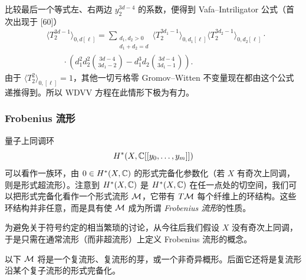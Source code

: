 比较最后一个等式左、右两边 $y_2^{3d-4}$ 的系数，便得到 Vafa–Intriligator 公式（首次出现于 [60]）
\begin{align*}
&\langle T_2^{3d-1}\rangle_{0,d[\ell]}=\sum_{\substack{d_1,d_2>0\\d_1+d_2=d}}\langle T_2^{3d_1-1}\rangle_{0,d_1[\ell]}\langle T_2^{3d_2-1}\rangle_{0,d_2[\ell]}\cdot\\
&\qquad\cdot\left(d_1^2d_2^2\binom{3d-4}{3d_1-2}-d_1^3d_2\binom{3d-4}{3d_1-1}\right).
\end{align*}
由于 $\langle T_2^2\rangle_{0,[\ell]}=1$，其他一切亏格零 Gromov–Witten 不变量现在都由这个公式递推得到。所以 WDVV 方程在此情形下极为有力。


\subsubsection{Frobenius 流形}

量子上同调环
\[
H^{*}(X,\mathbb{C}[[y_0,\dots,y_m]])
\]
可以看作一族环，由 $0\in H^{*}(X,\mathbb{C})$ 的形式完备化参数化（若 $X$ 有奇次上同调，则是形式超流形）。注意到 $H^{*}(X,\mathbb{C})$ 是 $H^{*}(X,\mathbb{C})$ 在任一点处的切空间，我们可以把形式完备化看作一个形式流形 $\mathcal{M}$，它带有 $T\mathcal{M}$ 每个纤维上的环结构。这些环结构并非任意，而是具有使 $\mathcal{M}$ 成为所谓 \emph{Frobenius 流形}的性质。

为避免关于符号约定的相当繁琐的讨论，从今往后我们假设 $X$ 没有奇次上同调，于是只需在通常流形（而非超流形）上定义 Frobenius 流形的概念。

以下 $\mathcal{M}$ 将是一个复流形、复流形的芽，或一个非奇异概形。后面它还将是复流形沿某个复子流形的形式完备化。

